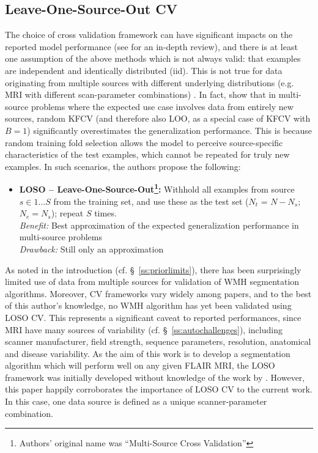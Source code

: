 \subsection{Leave-One-Source-Out CV}
The choice of cross validation framework can have significant impacts on the reported model performance (see \cite{Arlot2010} for an in-depth review), and there is at least one assumption of the above methods which is not always valid: that examples are independent and identically distributed (iid). This is not true for data originating from multiple sources with different underlying distributions (e.g. MRI with different scan-parameter combinations) \cite{Geras2013}. In fact, \citeauthor{Geras2013} show that in multi-source problems where the expected use case involves data from entirely new sources, random KFCV (and therefore also LOO, as a special case of KFCV with $B=1$) significantly overestimates the generalization performance. This is because random training fold selection allows the model to perceive source-specific characteristics of the test examples, which cannot be repeated for truly new examples. In such scenarios, the authors propose the following:
\begin{itemize}
  \item \textbf{LOSO -- Leave-One-Source-Out\footnote{Authors' original name was ``Multi-Source Cross Validation''}:} Withhold all examples from source $s\in 1\dots S$ from the training set, and use these as the test set ($N_t$ = $N-N_s$; $N_e = N_s$); repeat $S$ times.
  \\\textit{Benefit:} Best approximation of the expected generalization performance in multi-source problems
  \\\textit{Drawback:} Still only an approximation
\end{itemize}
As noted in the introduction (cf. \S\ \ref{ss:priorlimits}), there has been surprisingly limited use of data from multiple sources for validation of WMH segmentation algorithms. Moreover, CV frameworks vary widely among papers, and to the best of this author's knowledge, no WMH algorithm has yet been validated using LOSO CV. This represents a significant caveat to reported performances, since MRI have many sources of variability (cf. \S\ \ref{ss:autochallenges}), including scanner manufacturer, field strength, sequence parameters, resolution, anatomical and disease variability. As the aim of this work is to develop a segmentation algorithm which will perform well on any given FLAIR MRI, the LOSO framework was initially developed without knowledge of the work by \citeauthor{Geras2013}. However, this paper happily corroborates the importance of LOSO CV to the current work. In this case, one data source is defined as a unique scanner-parameter combination.
